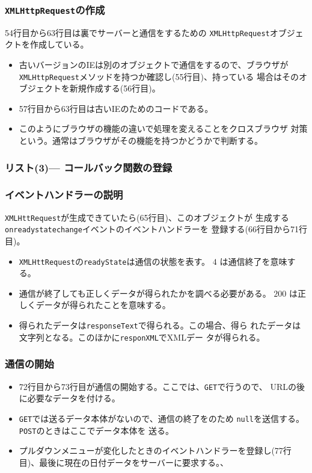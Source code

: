 \begin{frame}[containsverbatim]
\frametitle{\texttt{XMLHttpRequest}の作成}
54行目から63行目は裏でサーバーと通信をするための
\texttt{XMLHttpRequest}オブジェクトを作成している。
\begin{itemize}
 \item 古いバージョンのIEは別のオブジェクトで通信をするので、ブラウザが
       \texttt{XMLHttpRequest}メソッドを持つか確認し(55行目)、持っている
       場合はそのオブジェクトを新規作成する(56行目)。
 \item 57行目から63行目は古いIEのためのコードである。
 \item このようにブラウザの機能の違いで処理を変えることをクロスブラウザ
       対策という。通常はブラウザがその機能を持つかどうかで判断する。
\end{itemize}
\end{frame}
\begin{frame}[containsverbatim]
\frametitle{リスト(3)--- コールバック関数の登録}
\end{frame}
\begin{frame}[containsverbatim]
\frametitle{イベントハンドラーの説明}
\texttt{XMLHttRequest}が生成できていたら(65行目)、このオブジェクトが
       生成する\texttt{onreadystatechange}イベントのイベントハンドラーを
       登録する(66行目から71行目)。
 \begin{itemize}
  \item \texttt{XMLHttRequest}の\texttt{readyState}は通信の状態を表す。
	$4$ は通信終了を意味する。
  \item 通信が終了しても正しくデータが得られたかを調べる必要がある。
	$200$ は正しくデータが得られたことを意味する。
  \item 得られたデータは\texttt{responseText}で得られる。この場合、得ら
	れたデータは文字列となる。このほかに\texttt{responXML}でXMLデー
	タが得られる。
 \end{itemize}
\frametitle{通信の開始}
\begin{itemize}
 \item 72行目から73行目が通信の開始する。ここでは、\texttt{GET}で行うので、
       URLの後に必要なデータを付ける。
 \item \texttt{GET}では送るデータ本体がないので、通信の終了をのため
       \texttt{null}を送信する。\texttt{POST}のときはここでデータ本体を
       送る。
 \item プルダウンメニューが変化したときのイベントハンドラーを登録し(77行
       目)、最後に現在の日付データをサーバーに要求する。、
\end{itemize}
\end{frame}
